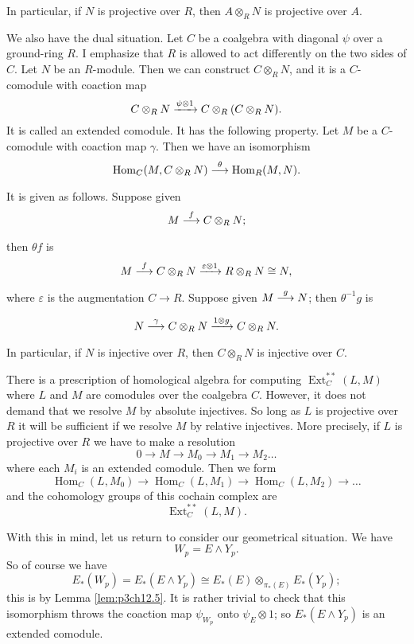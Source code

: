\documentclass[../main]{subfiles}
\begin{document}
In particular, if $N$ is projective over $R$, then $A\otimes_R N$ is projective over $A$.

\par We also have the dual situation. Let $C$ be a coalgebra with diagonal $\psi$ over a ground-ring $R$. I emphasize that $R$ is allowed to act differently on the two sides of $C$. Let $N$ be an $R$-module. Then we can construct $C\otimes_R N$, and it is a $C$-comodule with coaction map
\[C\otimes_R N \vra{\psi\otimes 1} C\otimes_R (C\otimes_R N).\]
It is called an extended comodule. It has the following property. Let $M$ be a $C$-comodule with coaction map $\gamma$. Then we have an isomorphism
\[\operatorname{Hom}_C(M,C\otimes_R N)\vra{\theta} \operatorname{Hom}_R(M,N).\]
It is given as follows. Suppose given
\[M\vra{f}C\otimes_R N;\]
then $\theta f$ is
\[M\vra{f}C\otimes_R N\vra{\varepsilon \otimes 1} R\otimes_R N\cong N,\]
where $\varepsilon$ is the augmentation $C\longrightarrow R$. Suppose given $M\vra{g} N$; then $\theta^{-1}g$ is 
\[N\vra{\gamma} C\otimes_R N \vra{1\otimes g} C\otimes_R N.\]
In particular, if $N$ is injective over $R$, then $C\otimes_R N$ is injective over $C$.

\par There is a prescription of homological algebra for computing $\operatorname{Ext}_C^{\ast\ast}(L,M)$ where $L$ and $M$ are comodules over the coalgebra $C$. However, it does not demand that we resolve $M$ by absolute injectives. So long as $L$ is projective over $R$ it will be sufficient if we resolve $M$ by relative injectives. More precisely, if $L$ is projective over $R$ we have to make a resolution 
\[0\longrightarrow M \longrightarrow M_0 \longrightarrow M_1 \longrightarrow M_2 \hdots\]
where each $M_i$ is an extended comodule. Then we form 
\[\operatorname{Hom}_C(L,M_0)\longrightarrow \operatorname{Hom}_C(L,M_1)\longrightarrow\operatorname{Hom}_C(L,M_2)\longrightarrow \hdots \]
and the cohomology groups of this cochain complex are 
\[\operatorname{Ext}_C^{\ast\ast}(L,M).\]

\par With this in mind, let us return to consider our geometrical situation. We have 
\[W_p=E\wedge Y_p.\]
So of course we have 
\[E_\ast(W_p)=E_\ast(E\wedge Y_p)\cong E_\ast(E)\otimes_{\pi_\ast(E)}E_\ast(Y_p);\]
this is by Lemma \ref{lem:p3ch12.5}. It is rather trivial to check that this isomorphism throws the coaction map $\psi_{W_p}$ onto $\psi_E\otimes 1$; so $E_\ast(E\wedge Y_p)$ is an extended comodule.
\end{document}
